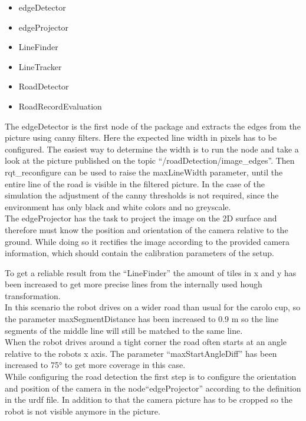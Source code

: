 \begin{itemize}
	\item edgeDetector
	\item edgeProjector
	\item LineFinder
	\item LineTracker
	\item RoadDetector
	\item RoadRecordEvaluation
\end{itemize}

The edgeDetector is the first node of the package and extracts the edges from the picture using canny filters. Here the expected line width in pixels has to be configured. The easiest way to determine the width is to run the node and take a look at the picture published on the topic ``/roadDetection/image\_edges''. Then rqt\_reconfigure can be used to raise the maxLineWidth parameter, until the entire line of the road is visible in the filtered picture. In the case of the simulation the adjustment of the canny thresholds is not required, since the environment has only black and white colors and no greyscale.\\

The edgeProjector has the task to project the image on the 2D surface and therefore must know the position and orientation of the camera relative to the ground. While doing so it rectifies the image according to the provided camera information, which should contain the calibration parameters of the setup.

To get a reliable result from the ``LineFinder'' the amount of tiles in x and y has been increased to get more precise lines from the internally used hough transformation.\\
In this scenario the robot drives on a wider road than usual for the carolo cup, so the parameter maxSegmentDistance has been increased to 0.9 m so the line segments of the middle line will still be matched to the same line.\\
When the robot drives around a tight corner the road often starts at an angle relative to the robots x axis. The parameter ``maxStartAngleDiff'' has been increased to 75° to get more coverage in this case.\\

While configuring the road detection the first step is to configure the orientation and position of the camera in the node``edgeProjector'' according to the definition in the urdf file. In addition to that the camera picture has to be cropped so the robot is not visible anymore in the picture.\\

